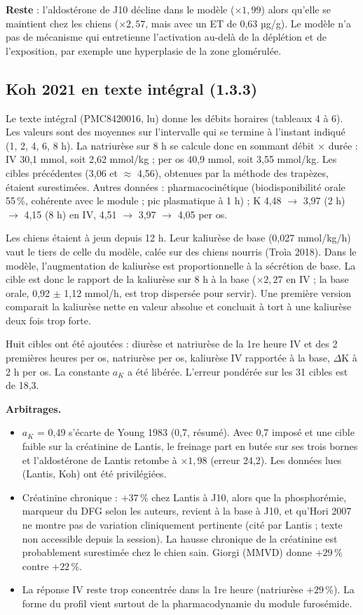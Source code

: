 \documentclass[10pt,a4paper]{article}
\begin{document}
\textbf{Reste} : l'aldostérone de J10 décline dans le modèle ($\times 1{,}99$) alors qu'elle se maintient chez les chiens ($\times 2{,}57$, mais avec un ET de 0,63 µg/g). Le modèle n'a pas de mécanisme qui entretienne l'activation au-delà de la déplétion et de l'exposition, par exemple une hyperplasie de la zone glomérulée.

\subsection{Koh 2021 en texte intégral (1.3.3)}
Le texte intégral (PMC8420016, lu) donne les débits horaires (tableaux 4 à 6). Les valeurs sont des moyennes sur l'intervalle qui se termine à l'instant indiqué (1, 2, 4, 6, 8 h). La natriurèse sur 8 h se calcule donc en sommant débit $\times$ durée : IV 30,1 mmol, soit 2,62 mmol/kg ; per os 40,9 mmol, soit 3,55 mmol/kg. Les cibles précédentes (3,06 et $\approx$ 4,56), obtenues par la méthode des trapèzes, étaient surestimées. Autres données : pharmacocinétique (biodisponibilité orale 55\,\%, cohérente avec le module ; pic plasmatique à 1 h) ; K 4,48 $\to$ 3,97 (2 h) $\to$ 4,15 (8 h) en IV, 4,51 $\to$ 3,97 $\to$ 4,05 per os.

Les chiens étaient à jeun depuis 12 h. Leur kaliurèse de base (0,027 mmol/kg/h) vaut le tiers de celle du modèle, calée sur des chiens nourris (Troìa 2018). Dans le modèle, l'augmentation de kaliurèse est proportionnelle à la sécrétion de base. La cible est donc le rapport de la kaliurèse sur 8 h à la base ($\times 2{,}27$ en IV ; la base orale, 0,92 $\pm$ 1,12 mmol/h, est trop dispersée pour servir). Une première version comparait la kaliurèse nette en valeur absolue et concluait à tort à une kaliurèse deux fois trop forte.

Huit cibles ont été ajoutées : diurèse et natriurèse de la 1re heure IV et des 2 premières heures per os, natriurèse per os, kaliurèse IV rapportée à la base, $\Delta$K à 2 h per os. La constante $a_K$ a été libérée. L'erreur pondérée sur les 31 cibles est de 18,3.

\textbf{Arbitrages.}
\begin{itemize}
\item $a_K$ = 0,49 s'écarte de Young 1983 (0,7, résumé). Avec 0,7 imposé et une cible faible sur la créatinine de Lantis, le freinage part en butée sur ses trois bornes et l'aldostérone de Lantis retombe à $\times 1{,}98$ (erreur 24,2). Les données lues (Lantis, Koh) ont été privilégiées.
\item Créatinine chronique : $+37$\,\% chez Lantis à J10, alors que la phosphorémie, marqueur du DFG selon les auteurs, revient à la base à J10, et qu'Hori 2007 ne montre pas de variation cliniquement pertinente (cité par Lantis ; texte non accessible depuis la session). La hausse chronique de la créatinine est probablement surestimée chez le chien sain. Giorgi (MMVD) donne $+29$\,\% contre $+22$\,\%.
\item La réponse IV reste trop concentrée dans la 1re heure (natriurèse $+29$\,\%). La forme du profil vient surtout de la pharmacodynamie du module furosémide.
\end{itemize}
\end{document}
